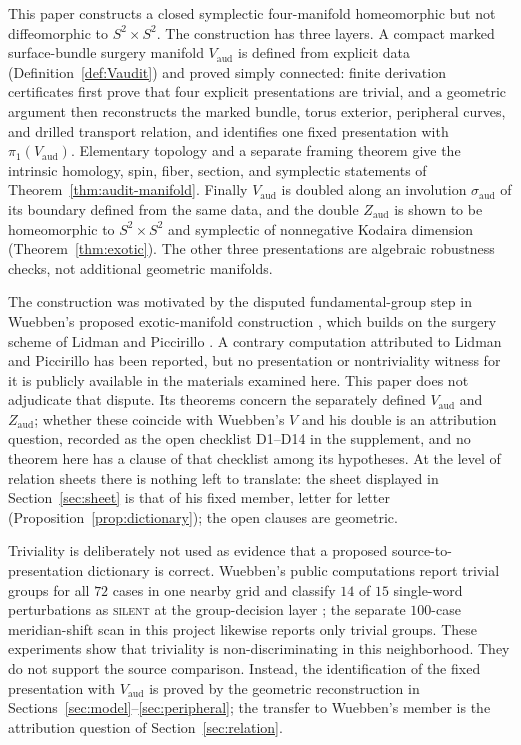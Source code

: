 \documentclass[11pt]{article}
\newcommand{\pione}{\pi_1}
\theoremstyle{definition}
\begin{document}
This paper constructs a closed symplectic four-manifold homeomorphic but
not diffeomorphic to $S^2\times S^2$.  The construction has three layers.
A compact marked surface-bundle surgery manifold $V_{\mathrm{aud}}$ is
defined from explicit data (Definition~\ref{def:Vaudit}) and proved simply
connected: finite derivation certificates first prove that four explicit
presentations are trivial, and a geometric argument then reconstructs the
marked bundle, torus exterior, peripheral curves, and drilled transport
relation, and identifies one fixed presentation with
$\pione(V_{\mathrm{aud}})$.  Elementary topology and a separate framing
theorem give the intrinsic homology, spin, fiber, section, and symplectic
statements of Theorem~\ref{thm:audit-manifold}.  Finally
$V_{\mathrm{aud}}$ is doubled along an involution $\sigma_{\mathrm{aud}}$
of its boundary defined from the same data, and the double
$Z_{\mathrm{aud}}$ is shown to be homeomorphic to $S^2\times S^2$ and
symplectic of nonnegative Kodaira dimension (Theorem~\ref{thm:exotic}).
The other three presentations are algebraic robustness checks, not
additional geometric manifolds.

The construction was motivated by the disputed fundamental-group step in
Wuebben's proposed exotic-manifold construction \cite{Wuebben}, which
builds on the surgery scheme of Lidman and Piccirillo
\cite{LidmanPiccirillo}.  A contrary computation attributed to Lidman and
Piccirillo has been reported, but no presentation or nontriviality witness
for it is publicly available in the materials examined here.  This paper
does not adjudicate that dispute.  Its theorems concern the separately
defined $V_{\mathrm{aud}}$ and $Z_{\mathrm{aud}}$; whether these coincide
with Wuebben's $V$ and his double is an attribution question, recorded as
the open checklist D1--D14 in the supplement, and no theorem here has a
clause of that checklist among its hypotheses.  At the level of relation
sheets there is nothing left to translate: the sheet displayed in
Section~\ref{sec:sheet} is that of his fixed member, letter for letter
(Proposition~\ref{prop:dictionary}); the open clauses are geometric.

Triviality is deliberately not used as evidence that a proposed
source-to-presentation dictionary is correct.  Wuebben's public
computations report trivial groups for all $72$ cases in one nearby grid and
classify $14$ of $15$ single-word perturbations as \textsc{silent} at the
group-decision layer \cite{WuebbenRepo}; the separate $100$-case
meridian-shift scan in this project likewise reports only trivial groups.
These experiments show that triviality is non-discriminating in this
neighborhood.  They do not support the source comparison.  Instead, the
identification of the fixed presentation with $V_{\mathrm{aud}}$ is proved
by the geometric reconstruction in
Sections~\ref{sec:model}--\ref{sec:peripheral}; the transfer to Wuebben's
member is the attribution question of Section~\ref{sec:relation}.
\end{document}
